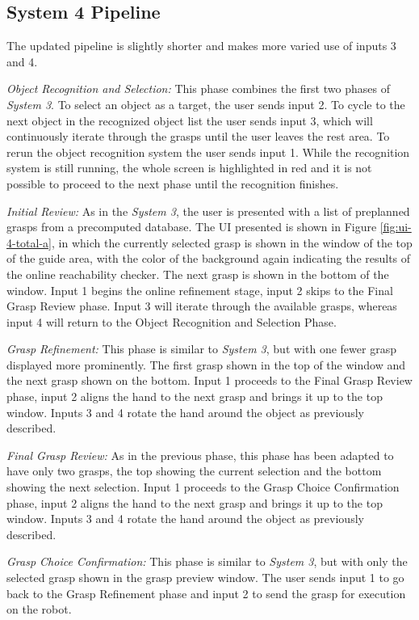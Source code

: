 \subsection*{System 4 Pipeline}
The updated pipeline is slightly shorter and makes more varied use of inputs 3 and 4. 

\emph{Object Recognition and Selection:} This phase combines the first two phases of \emph{System 3}. To select an object as a target, the user sends input 2. To cycle to the next object in the recognized object list the user sends input 3, which will continuously iterate through the grasps until the user leaves the rest area. To rerun the object recognition system the user sends input 1. While the recognition system is still running, the whole screen is highlighted in red and it is not possible to proceed to the next phase until the recognition finishes. 

\emph{Initial Review:} As in the \emph{System 3}, the user is presented with a list of preplanned grasps from a precomputed database. The UI presented is shown in Figure \ref{fig:ui-4-total-a}, in which the currently selected grasp is shown in the window of the top of the guide area, with the color of the background again indicating the results of the online reachability checker. The next grasp is shown in the bottom of the window. Input 1 begins the online refinement stage, input 2 skips to the Final Grasp Review phase. Input 3 will iterate through the available grasps, whereas input 4 will return to the Object Recognition and Selection Phase.

\emph{Grasp Refinement:} This phase is similar to \emph{System 3}, but with one fewer grasp displayed more prominently. The first grasp shown in the top of the window and the next grasp shown on the bottom. Input 1 proceeds to the Final Grasp Review phase, input 2 aligns the hand to the next grasp and brings it up to the top window. Inputs 3 and 4 rotate the hand around the object as previously described. 

\emph{Final Grasp Review:} As in the previous phase, this phase has been adapted to have only two grasps, the top showing the current selection and the bottom showing the next selection. Input 1 proceeds to the Grasp Choice Confirmation phase, input 2 aligns the hand to the next grasp and brings it up to the top window. Inputs 3 and 4 rotate the hand around the object as previously described. 

\emph{Grasp Choice Confirmation:} This phase is similar to \emph{System 3}, but with only the selected grasp shown in the grasp preview window. The user sends input 1 to go back to the Grasp Refinement phase and input 2 to send the grasp for execution on the robot.

